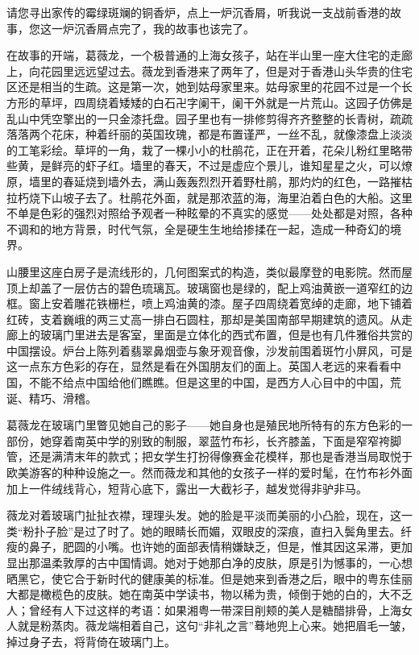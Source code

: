\par 请您寻出家传的霉绿斑斓的铜香炉，点上一炉沉香屑，听我说一支战前香港的故事，您这一炉沉香屑点完了，我的故事也该完了。
\par 在故事的开端，葛薇龙，一个极普通的上海女孩子，站在半山里一座大住宅的走廊上，向花园里远远望过去。薇龙到香港来了两年了，但是对于香港山头华贵的住宅区还是相当的生疏。这是第一次，她到姑母家里来。姑母家里的花园不过是一个长方形的草坪，四周绕着矮矮的白石卍字阑干，阑干外就是一片荒山。这园子仿佛是乱山中凭空擎出的一只金漆托盘。园子里也有一排修剪得齐齐整整的长青树，疏疏落落两个花床，种着纤丽的英国玫瑰，都是布置谨严，一丝不乱，就像漆盘上淡淡的工笔彩绘。草坪的一角，栽了一棵小小的杜鹃花，正在开着，花朵儿粉红里略带些黄，是鲜亮的虾子红。墙里的春天，不过是虚应个景儿，谁知星星之火，可以燎原，墙里的春延烧到墙外去，满山轰轰烈烈开着野杜鹃，那灼灼的红色，一路摧枯拉朽烧下山坡子去了。杜鹃花外面，就是那浓蓝的海，海里泊着白色的大船。这里不单是色彩的强烈对照给予观者一种眩晕的不真实的感觉——处处都是对照，各种不调和的地方背景，时代气氛，全是硬生生地给掺揉在一起，造成一种奇幻的境界。
\par 山腰里这座白房子是流线形的，几何图案式的构造，类似最摩登的电影院。然而屋顶上却盖了一层仿古的碧色琉璃瓦。玻璃窗也是绿的，配上鸡油黄嵌一道窄红的边框。窗上安着雕花铁栅栏，喷上鸡油黄的漆。屋子四周绕着宽绰的走廊，地下铺着红砖，支着巍峨的两三丈高一排白石圆柱，那却是美国南部早期建筑的遗风。从走廊上的玻璃门里进去是客室，里面是立体化的西式布置，但是也有几件雅俗共赏的中国摆设。炉台上陈列着翡翠鼻烟壶与象牙观音像，沙发前围着斑竹小屏风，可是这一点东方色彩的存在，显然是看在外国朋友们的面上。英国人老远的来看看中国，不能不给点中国给他们瞧瞧。但是这里的中国，是西方人心目中的中国，荒诞、精巧、滑稽。
\par 葛薇龙在玻璃门里瞥见她自己的影子——她自身也是殖民地所特有的东方色彩的一部份，她穿着南英中学的别致的制服，翠蓝竹布衫，长齐膝盖，下面是窄窄袴脚管，还是满清末年的款式；把女学生打扮得像赛金花模样，那也是香港当局取悦于欧美游客的种种设施之一。然而薇龙和其他的女孩子一样的爱时髦，在竹布衫外面加上一件绒线背心，短背心底下，露出一大截衫子，越发觉得非驴非马。
\par 薇龙对着玻璃门扯扯衣襟，理理头发。她的脸是平淡而美丽的小凸脸，现在，这一类“粉扑子脸”是过了时了。她的眼睛长而媚，双眼皮的深痕，直扫入鬓角里去。纤瘦的鼻子，肥圆的小嘴。也许她的面部表情稍嫌缺乏，但是，惟其因这呆滞，更加显出那温柔敦厚的古中国情调。她对于她那白净的皮肤，原是引为憾事的，一心想晒黑它，使它合于新时代的健康美的标准。但是她来到香港之后，眼中的粤东佳丽大都是橄榄色的皮肤。她在南英中学读书，物以稀为贵，倾倒于她的白的，大不乏人；曾经有人下过这样的考语：如果湘粤一带深目削颊的美人是糖醋排骨，上海女人就是粉蒸肉。薇龙端相着自己，这句“非礼之言”蓦地兜上心来。她把眉毛一皱，掉过身子去，将背倚在玻璃门上。

